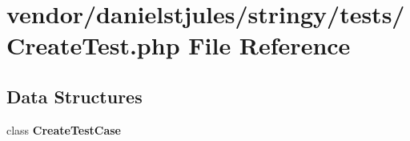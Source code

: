 \section{vendor/danielstjules/stringy/tests/\+Create\+Test.php File Reference}
\label{danielstjules_2stringy_2tests_2_create_test_8php}
\subsection*{Data Structures}
\begin{DoxyCompactItemize}
\item 
class {\bf Create\+Test\+Case}
\end{DoxyCompactItemize}
